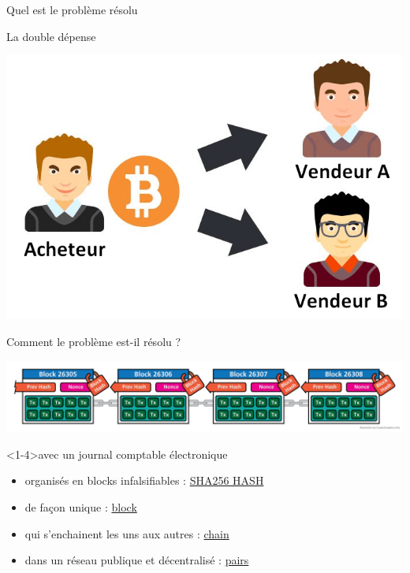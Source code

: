 \documentclass[presentation]{beamer}
\begin{document}
\begin{frame}[label={sec:org41f4ea0}]{Quel est le problème résolu}
\begin{block}{La double dépense}
\begin{center}
\includegraphics[width=.8\textwidth]{Pictures/double_depense.png}
\end{center}
\end{block}

\begin{block}{Comment le problème est-il résolu ?}
\begin{center}
\includegraphics[width=\textwidth]{Pictures/cryptographics/anatomy-of-a-chain-1.png}
\end{center}
\begin{block}<1-4>{avec un journal comptable électronique}
\begin{itemize}
\item <1>organisés en blocks \alert{infalsifiables} : \href{https://andersbrownworth.com/blockchain/hash}{SHA256 HASH}
\item <2>de façon unique : \href{https://andersbrownworth.com/blockchain/block}{block}
\item <3>qui s'\alert{enchainent} les uns aux autres : \href{https://andersbrownworth.com/blockchain/blockchain}{chain}
\item <4>dans un réseau \alert{publique et décentralisé} : \href{https://andersbrownworth.com/blockchain/distributed}{pairs}
\end{itemize}
\end{block}


\end{block}
\end{frame}
\end{document}
